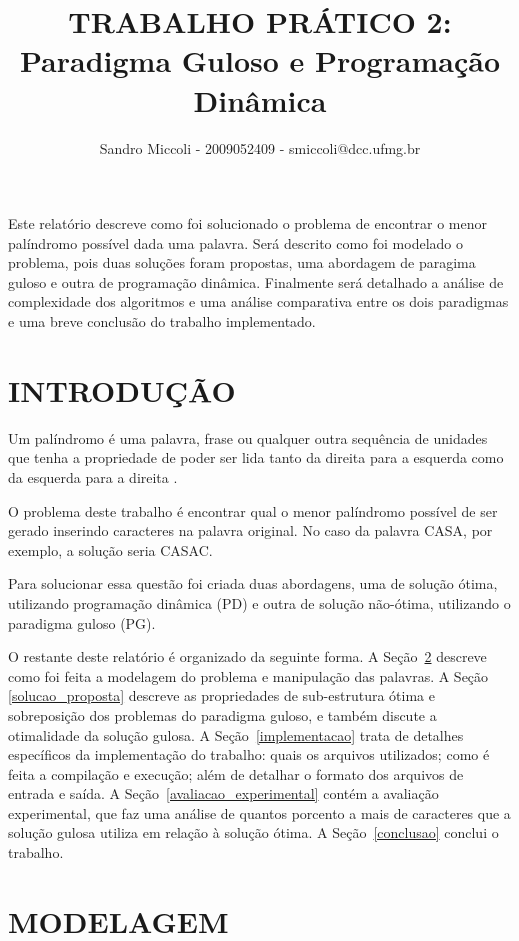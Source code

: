 \documentclass[12pt]{article}
\title{TRABALHO PRÁTICO 2: \\ Paradigma Guloso e Programação Dinâmica}
\author{Sandro Miccoli - 2009052409 - smiccoli@dcc.ufmg.br}
\begin{document}
\maketitle

\begin{resumo}
Este relatório descreve como foi solucionado o problema de encontrar o menor palíndromo possível dada uma palavra. Será descrito como foi modelado o problema, pois duas soluções foram propostas, uma abordagem de paragima guloso e outra de programação dinâmica. Finalmente será detalhado a análise de complexidade dos algoritmos e uma análise comparativa entre os dois paradigmas e uma breve conclusão do trabalho implementado.
\end{resumo}

\section{INTRODUÇÃO}

    Um palíndromo é uma palavra, frase ou qualquer outra sequência de unidades que tenha a propriedade de poder ser lida tanto da direita para a esquerda como da esquerda para a direita \cite{wikipalin}.

    O problema deste trabalho é encontrar qual o menor palíndromo possível de ser gerado inserindo caracteres na palavra original. No caso da palavra CASA, por exemplo, a solução seria CASAC.

    Para solucionar essa questão foi criada duas abordagens, uma de solução ótima, utilizando programação dinâmica (PD) e outra de solução não-ótima, utilizando o paradigma guloso (PG).

	O restante deste relatório é organizado da seguinte forma. A Seção~\ref{modelagem} descreve como foi feita a modelagem do problema e manipulação das palavras. A Seção \ref{solucao_proposta} descreve as propriedades de sub-estrutura ótima e sobreposição dos problemas do paradigma guloso, e também discute a otimalidade da solução gulosa. A Seção~\ref{implementacao} trata de detalhes específicos da implementação do trabalho: quais os arquivos utilizados; como é feita a compilação e execução; além de detalhar o formato dos arquivos de entrada e saída. A Seção~\ref{avaliacao_experimental} contém a avaliação experimental, que faz uma análise de quantos porcento a mais de caracteres que a solução gulosa utiliza em relação à solução ótima. A Seção~\ref{conclusao} conclui o trabalho.


\section{MODELAGEM}
\label{modelagem}
\end{document}
